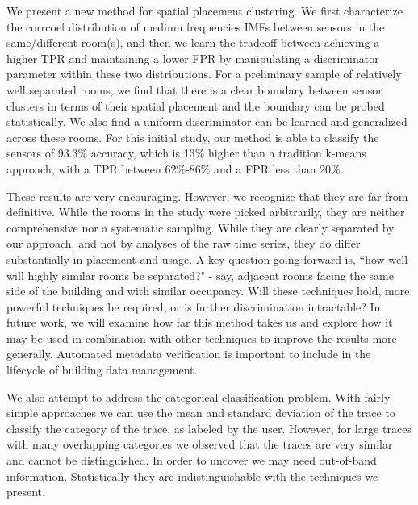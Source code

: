 We present a new method for spatial placement clustering.  
We first characterize the corrcoef distribution of medium frequencies IMFs between sensors in the same/different room(s), and then we learn the tradeoff between achieving a higher TPR and maintaining a lower FPR by manipulating a discriminator parameter within these two distributions. 
For a preliminary sample of relatively well separated rooms, we find that there is a clear boundary between sensor clusters in terms of their spatial placement and the boundary can be probed statistically.  We also find 
a uniform discriminator can be learned and generalized across these rooms.  
For this initial study, our method is able to classify the sensors of 93.3\% accuracy, which is 13\% higher than a tradition k-means approach, with a TPR between 62\%-86\% and a FPR less than 20\%. 

These results are very encouraging. However, we recognize that they are far from definitive. While the rooms in the study were picked arbitrarily, they are neither comprehensive nor a systematic sampling.  While they are clearly separated by our approach, and not by analyses of the raw time series, they do differ substantially in placement and usage.  A key question going forward is, ``how well will highly similar rooms be separated?"  - say, adjacent rooms facing the same side of the building and with similar occupancy. Will these techniques hold, more powerful techniques be required, or is further discrimination intractable? In future work, we will examine how far this method takes us and explore how it may be used in combination with other techniques to improve the results more generally. Automated metadata verification is important to include in the lifecycle of building data management.

We also attempt to address the categorical classification problem.  With fairly simple approaches we can use the mean and standard deviation
of the trace to classify the category of the trace, as labeled by the user.  However, for large traces with many
overlapping categories we observed that the traces are very similar and cannot be distinguished.  In order to uncover we may need out-of-band
information.  Statistically they are indistinguishable with the techniques we present.









